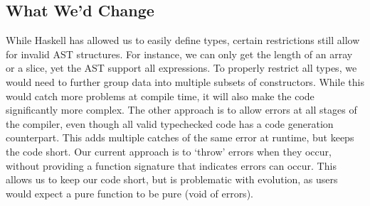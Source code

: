 \documentclass[11pt]{article}
\begin{document}
\subsection{What We'd Change}

While Haskell has allowed us to easily define types, certain
restrictions still allow for invalid AST structures.  For instance, we
can only get the length of an array or a slice, yet the AST support
all expressions.  To properly restrict all types, we would need to
further group data into multiple subsets of constructors\cite{so:pattern/matching/subset}.  While this
would catch more problems at compile time, it will also make the code
significantly more complex.  The other approach is to allow errors at
all stages of the compiler, even though all valid typechecked code has
a code generation counterpart.  This adds multiple catches of the same error
at runtime, but keeps the code short.  Our current approach is to
`throw' errors when they occur, without providing a function signature
that indicates errors can occur.  This allows us to keep our code
short, but is problematic with evolution, as users would expect a pure
function to be pure (void of errors).
\end{document}
